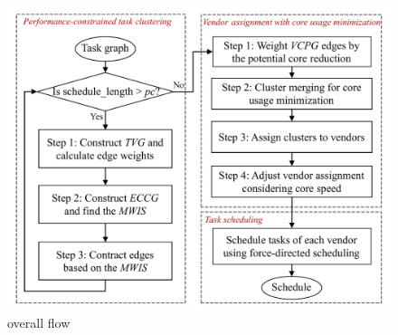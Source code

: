 \documentclass[10pt,journal, compsoc]{IEEEtran}
\begin{document}

\begin{figure}[!t]
\centering
\includegraphics[width=\linewidth]{figure/overall_flow.pdf}
\caption{overall flow}
\label{fig:overall_flow}
\end{figure}
\end{document}
